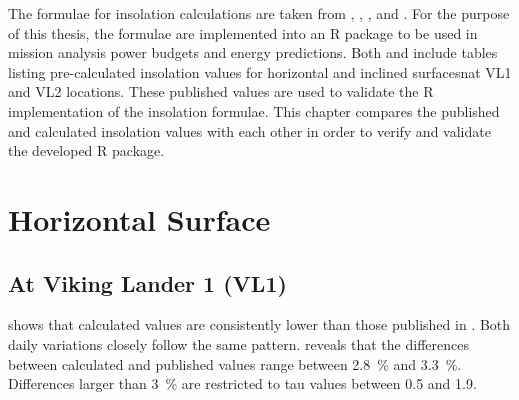 The formulae for insolation calculations are taken from , , , and . For the purpose of this thesis, the formulae are implemented into an R package to be used in mission analysis power budgets and energy predictions. Both  and  include tables listing pre-calculated insolation values for horizontal and inclined surfacesnat \ac{VL1} and \ac{VL2} locations. These published values are used to validate the R implementation of the insolation formulae. This chapter compares the published and calculated insolation values with each other in order to verify and validate the developed R package.


\section{Horizontal Surface}
\subsection{At Viking Lander 1 (VL1)}
 shows that calculated values are consistently lower than those published in . Both daily variations closely follow the same pattern.  reveals that the differences between calculated and published values range between \SI{2.8}{\percent} and \SI{3.3}{\percent}. Differences larger than \SI{3}{\percent} are restricted to tau values between 0.5 and 1.9.

